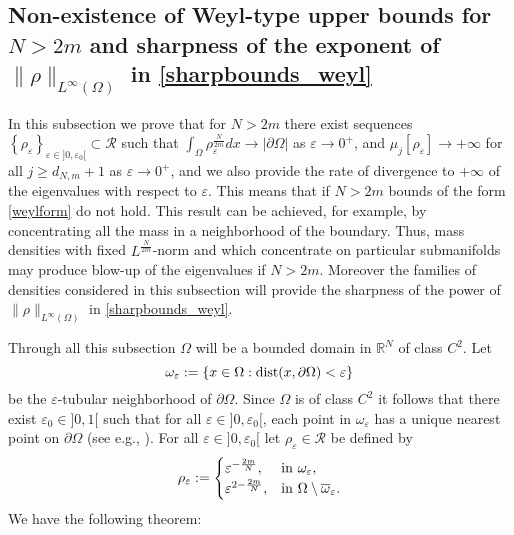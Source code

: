 \documentclass[11pt,a4paper]{amsart}
\numberwithin{equation}{section}
\begin{document}


\subsection{Non-existence of Weyl-type upper bounds for \texorpdfstring{$N>2m$}{N>2m} and sharpness of the exponent of \texorpdfstring{$\|\rho\|_{L^{\infty}(\Omega)}$}{Linf2} in \texorpdfstring{\eqref{sharpbounds_weyl}}{4}}\label{sec:42}

In this subsection we prove that for $N>2m$ there exist sequences $\left\{\rho_{\varepsilon}\right\}_{\varepsilon\in]0,\varepsilon_0[}\subset\mathcal R$ such that $\int_{\Omega}\rho_{\varepsilon}^{\frac{N}{2m}}dx\rightarrow|\partial\Omega|$ as $\varepsilon\rightarrow 0^+$, and $\mu_j[\rho_{\varepsilon}]\rightarrow +\infty$ for all $j\geq d_{N,m}+1$ as $\varepsilon\rightarrow 0^+$, and we also provide the rate of divergence to $+\infty$ of the eigenvalues with respect to $\varepsilon$. This means that if $N>2m$ bounds of the form \eqref{weylform} do not hold. This result can be achieved, for example, by concentrating all the mass in a neighborhood of the boundary. Thus, mass densities with fixed $L^{\frac{N}{2m}}$-norm and which concentrate on particular submanifolds may produce blow-up of the eigenvalues if $N>2m$. Moreover the families of densities considered in this subsection will provide the sharpness of the power of $\|\rho\|_{L^{\infty}(\Omega)}$ in \eqref{sharpbounds_weyl}.



Through all this subsection $\Omega$ will be a bounded domain in $\mathbb R^N$ of class $C^{2}$. Let
\begin{equation}\label{strip}
\omega_{\varepsilon}:=\left\{x\in\Omega:{\rm dist}(x,\partial\Omega)<\varepsilon\right\}
\end{equation}
be the $\varepsilon$-tubular neighborhood of $\partial\Omega$. Since $\Omega$ is of class $C^2$ it follows that there exist $\varepsilon_0\in]0,1[$ such that for all $\varepsilon\in]0,\varepsilon_0[$, each point in $\omega_{\varepsilon}$ has a unique nearest point on $\partial\Omega$ (see e.g., \cite{krantz}). For all $\varepsilon\in]0,\varepsilon_0[$ let $\rho_\varepsilon\in\mathcal R$ be defined by
\begin{equation}\label{rhoepsweyl}
\rho_{\varepsilon}:=
\begin{cases}
\varepsilon^{-\frac{2m}{N}},& {\rm in\ } \omega_{\varepsilon},\\
\varepsilon^{2-\frac{2m}{N}},& {\rm in\ } \Omega\setminus\overline\omega_{\varepsilon}.
\end{cases}
\end{equation}
We have the following theorem:
\end{document}
